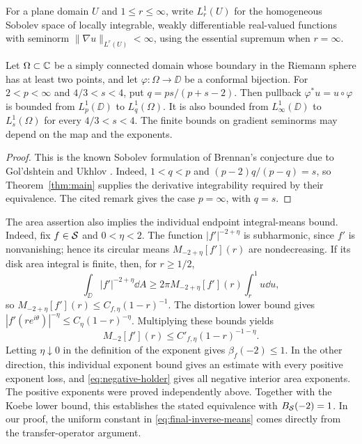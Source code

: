 For a plane domain $U$ and $1\leq r\leq\infty$, write $L_r^1(U)$
for the homogeneous Sobolev space of locally integrable, weakly
differentiable real-valued functions with seminorm
$\|\nabla u\|_{L^r(U)}<\infty$, using the essential supremum when
$r=\infty$.

\begin{corollary}\label{cor:sobolev-pullback}
 Let $\Omega\subset\mathbb C$ be a simply connected domain whose boundary
 in the Riemann sphere has at least two points, and let
 $\varphi:\Omega\to\DD$ be a
 conformal bijection. For $2<p<\infty$ and $4/3<s<4$, put
 $q=ps/(p+s-2)$. Then pullback $\varphi^*u=u\circ\varphi$ is bounded
 from $L_p^1(\DD)$ to $L_q^1(\Omega)$. It is also bounded from
 $L_\infty^1(\DD)$ to $L_s^1(\Omega)$ for every $4/3<s<4$.
 The finite bounds on gradient seminorms may depend on the map and
 the exponents.
\end{corollary}

\begin{proof}
 This is the known Sobolev formulation of Brennan's conjecture due to
 Gol'dshtein and Ukhlov
 \cite[Equivalence Theorem and its following Remark~2]{GoldshteinUkhlov2013}.
 Indeed, $1<q<p$ and $(p-2)q/(p-q)=s$, so Theorem~\ref{thm:main}
 supplies the derivative integrability required by their equivalence.
 The cited remark gives the case $p=\infty$, with $q=s$.
\end{proof}

The area assertion also implies the individual endpoint
integral-means bound.  Indeed, fix $f\in\mathcal S$ and $0<\eta<2$.
The function $|f'|^{-2+\eta}$ is subharmonic, since $f'$ is
nonvanishing; hence its circular means $M_{-2+\eta}[f'](r)$
are nondecreasing.  If its disk area integral is finite, then,
for $r\geq1/2$,
\[
 \int_{\DD}|f'|^{-2+\eta}\dd A
 \geq2\pi M_{-2+\eta}[f'](r)\int_r^1u\dd u,
\]
so $M_{-2+\eta}[f'](r)\leq C_{f,\eta}(1-r)^{-1}$.
The distortion lower bound gives
$|f'(re^{i\theta})|^{-\eta}\leq C_\eta(1-r)^{-\eta}$.
Multiplying these bounds yields
\[
 M_{-2}[f'](r)\leq C'_{f,\eta}(1-r)^{-1-\eta}.
\]
Letting $\eta\downarrow0$ in the definition of the exponent gives
$\beta_f(-2)\leq1$.  In the other direction, this individual
exponent bound gives an estimate with every positive exponent
loss, and \eqref{eq:negative-holder} gives all negative interior
area exponents.  The positive exponents were proved independently
above.  Together with the Koebe lower bound, this establishes the
stated equivalence with $B_{\mathcal S}(-2)=1$.  In our proof, the uniform constant in
\eqref{eq:final-inverse-means} comes directly from the transfer-operator
argument.

